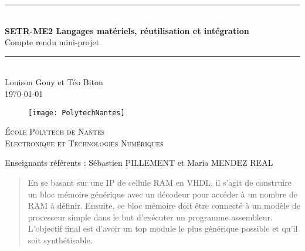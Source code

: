 \newcommand{\HRule}{\rule{\linewidth}{0.5mm}} %

\vspace*{1cm}

\begin{center} %
	\HRule \\[0.2cm] %
	\Large
	\textbf{SETR-ME2 Langages matériels, réutilisation et intégration}\\ %
	\vspace{1cm}
Compte rendu mini-projet \\

	\large
	\HRule \\[1.5cm] %
	\normalsize
	Louison Gouy et Téo Biton\\
	\today %
\end{center}

\begin{figure}[H] %
	\centering
	\texttt{[image: PolytechNantes]}
\end{figure}

\vspace{2cm}

\begin{center}\large %
	\textsc{École Polytech de Nantes}\\
	\textsc{Electronique et Technologies Numériques}
\end{center}

\vspace{2cm}

\noindent
Enseignants référents : Sébastien PILLEMENT et Maria MENDEZ REAL
\vspace{2cm}

\begin{abstract}
En se basant sur une IP de cellule RAM en VHDL, il s'agit de construire un bloc mémoire générique avec un décodeur pour accéder à un nombre de RAM à définir.
Ensuite, ce bloc mémoire doit être connecté à un modèle de processeur simple dans le but d'exécuter un programme assembleur. L'objectif final est d'avoir un top module
le plus générique possible et qu'il soit synthétisable.
\end{abstract}

\thispagestyle{empty}

